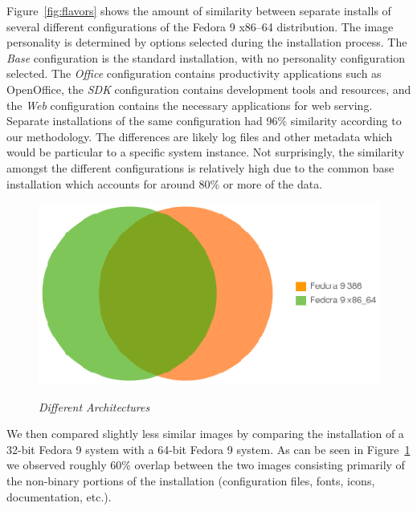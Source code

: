 Figure~\ref{fig:flavors} shows the amount of similarity between
separate installs of several different configurations of the Fedora 9
x86--64 distribution.  The image personality is determined by options
selected during the installation process.
The \emph{Base} configuration is the 
standard installation, with no personality configuration selected.
The \emph{Office} configuration contains productivity applications such
as OpenOffice, the \emph{SDK} configuration contains development tools
and resources, and the \emph{Web} configuration contains the necessary
applications for web serving.
Separate installations of the same configuration had 96\% similarity 
according to our methodology.  The differences are likely log files and
other metadata which would be particular to a specific system instance.
Not surprisingly, the similarity amongst the different configurations is 
relatively high due to the common base installation which accounts for 
around 80\% or more of the data.

\begin{figure}[htbp]
\begin{centering}
\resizebox{\columnwidth}{!}
{\includegraphics{fedorax86}}
\small\itshape
\caption{\small\itshape Different Architectures}
\label{fig:arch}
\end{centering}
\end{figure}

We then compared slightly less similar images by
comparing the installation of a 32-bit Fedora 9 system with
a 64-bit Fedora 9 system.  As can be seen in Figure~\ref{fig:arch}
we observed roughly 60\% overlap between the two images consisting 
primarily of the non-binary portions of the installation (configuration
files, fonts, icons, documentation, etc.).

